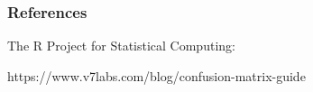 \documentclass[border=5mm, convert, usenames, dvipsnames,beamer]{standalone}
\begin{document}
\begin{frame}[ fragile]{}

\frametitle{References}

\vspace{-30}
\noindent
The R Project for Statistical Computing:

\vspace{10}
\noindent
{}

\vspace{10}
\noindent
https://www.v7labs.com/blog/confusion-matrix-guide


\end{frame}
\end{document}
